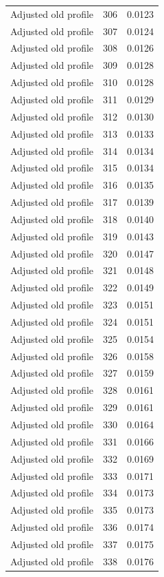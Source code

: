 \begin{table}[htbp]
\begin{tabular}{lll}
Adjusted old profile & 306 & 0.0123 \\
Adjusted old profile & 307 & 0.0124 \\
Adjusted old profile & 308 & 0.0126 \\
Adjusted old profile & 309 & 0.0128 \\
Adjusted old profile & 310 & 0.0128 \\
Adjusted old profile & 311 & 0.0129 \\
Adjusted old profile & 312 & 0.0130 \\
Adjusted old profile & 313 & 0.0133 \\
Adjusted old profile & 314 & 0.0134 \\
Adjusted old profile & 315 & 0.0134 \\
Adjusted old profile & 316 & 0.0135 \\
Adjusted old profile & 317 & 0.0139 \\
Adjusted old profile & 318 & 0.0140 \\
Adjusted old profile & 319 & 0.0143 \\
Adjusted old profile & 320 & 0.0147 \\
Adjusted old profile & 321 & 0.0148 \\
Adjusted old profile & 322 & 0.0149 \\
Adjusted old profile & 323 & 0.0151 \\
Adjusted old profile & 324 & 0.0151 \\
Adjusted old profile & 325 & 0.0154 \\
Adjusted old profile & 326 & 0.0158 \\
Adjusted old profile & 327 & 0.0159 \\
Adjusted old profile & 328 & 0.0161 \\
Adjusted old profile & 329 & 0.0161 \\
Adjusted old profile & 330 & 0.0164 \\
Adjusted old profile & 331 & 0.0166 \\
Adjusted old profile & 332 & 0.0169 \\
Adjusted old profile & 333 & 0.0171 \\
Adjusted old profile & 334 & 0.0173 \\
Adjusted old profile & 335 & 0.0173 \\
Adjusted old profile & 336 & 0.0174 \\
Adjusted old profile & 337 & 0.0175 \\
Adjusted old profile & 338 & 0.0176 \\

\end{tabular}
\end{table}
